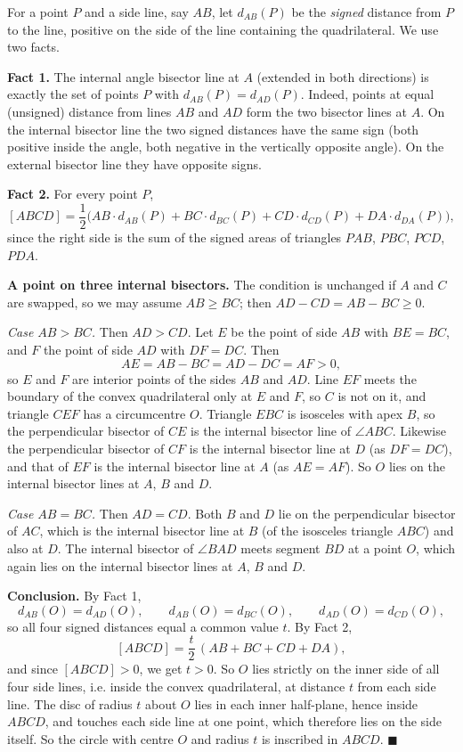 For a point $P$ and a side line, say $AB$, let $d_{AB}(P)$ be the \emph{signed} distance from $P$ to the line, positive on the side of the line containing the quadrilateral. We use two facts.

\textbf{Fact 1.} The internal angle bisector line at $A$ (extended in both directions) is exactly the set of points $P$ with $d_{AB}(P)=d_{AD}(P)$. Indeed, points at equal (unsigned) distance from lines $AB$ and $AD$ form the two bisector lines at $A$. On the internal bisector line the two signed distances have the same sign (both positive inside the angle, both negative in the vertically opposite angle). On the external bisector line they have opposite signs.

\textbf{Fact 2.} For every point $P$,
\[[ABCD]=\dfrac12\bigl(AB\cdot d_{AB}(P)+BC\cdot d_{BC}(P)+CD\cdot d_{CD}(P)+DA\cdot d_{DA}(P)\bigr),\]
since the right side is the sum of the signed areas of triangles $PAB$, $PBC$, $PCD$, $PDA$.

\textbf{A point on three internal bisectors.} The condition is unchanged if $A$ and $C$ are swapped, so we may assume $AB\ge BC$; then $AD-CD=AB-BC\ge0$.

\emph{Case $AB>BC$.} Then $AD>CD$. Let $E$ be the point of side $AB$ with $BE=BC$, and $F$ the point of side $AD$ with $DF=DC$. Then
\[AE=AB-BC=AD-DC=AF>0,\]
so $E$ and $F$ are interior points of the sides $AB$ and $AD$. Line $EF$ meets the boundary of the convex quadrilateral only at $E$ and $F$, so $C$ is not on it, and triangle $CEF$ has a circumcentre $O$. Triangle $EBC$ is isosceles with apex $B$, so the perpendicular bisector of $CE$ is the internal bisector line of $\angle ABC$. Likewise the perpendicular bisector of $CF$ is the internal bisector line at $D$ (as $DF=DC$), and that of $EF$ is the internal bisector line at $A$ (as $AE=AF$). So $O$ lies on the internal bisector lines at $A$, $B$ and $D$.

\emph{Case $AB=BC$.} Then $AD=CD$. Both $B$ and $D$ lie on the perpendicular bisector of $AC$, which is the internal bisector line at $B$ (of the isosceles triangle $ABC$) and also at $D$. The internal bisector of $\angle BAD$ meets segment $BD$ at a point $O$, which again lies on the internal bisector lines at $A$, $B$ and $D$.

\textbf{Conclusion.} By Fact 1,
\[d_{AB}(O)=d_{AD}(O),\qquad d_{AB}(O)=d_{BC}(O),\qquad d_{AD}(O)=d_{CD}(O),\]
so all four signed distances equal a common value $t$. By Fact 2,
\[[ABCD]=\dfrac t2\,(AB+BC+CD+DA),\]
and since $[ABCD]>0$, we get $t>0$. So $O$ lies strictly on the inner side of all four side lines, i.e. inside the convex quadrilateral, at distance $t$ from each side line. The disc of radius $t$ about $O$ lies in each inner half-plane, hence inside $ABCD$, and touches each side line at one point, which therefore lies on the side itself. So the circle with centre $O$ and radius $t$ is inscribed in $ABCD$. $\blacksquare$

